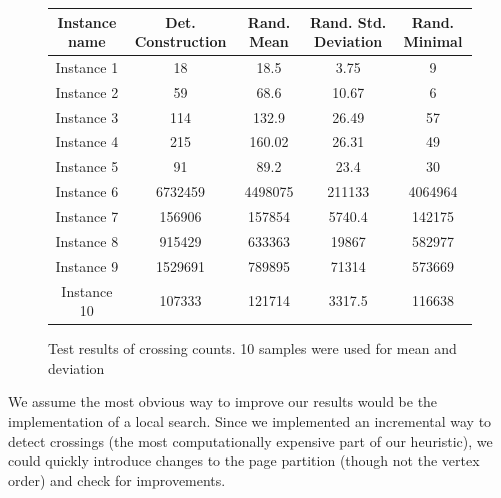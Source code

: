 \documentclass [11pt]{article}
\begin{document}
\begin{figure}[H]
\centering
  \begin{tabular}{| c | c | c | c | c |}
\hline
Instance name & Det. Construction & Rand. Mean & Rand. Std. Deviation & Rand. Minimal\\
\hline
Instance 1 & 18 & 18.5 & 3.75 & 9\\
\hline 
Instance 2 & 59 & 68.6 & 10.67 &6\\
\hline 
Instance 3 & 114 & 132.9 & 26.49 &57\\
\hline 
Instance 4 & 215 & 160.02 & 26.31 &49\\
\hline 
Instance 5 & 91 & 89.2  & 23.4 &30\\
\hline 
Instance 6 & 6732459 & 4498075 & 211133 &4064964\\
\hline 
Instance 7 & 156906 & 157854 & 5740.4 &  142175\\
\hline
Instance 8 & 915429 & 633363 & 19867 & 582977\\
\hline 
Instance 9 & 1529691 & 789895 & 71314 & 573669\\
\hline 
Instance 10 & 107333 & 121714 & 3317.5 &  116638\\
\hline 
\end{tabular}
\caption{Test results of crossing counts.  10 samples were used for mean and deviation}
\end{figure}




We assume the most obvious way to improve our results would be the implementation of a local search. Since we implemented an incremental way to detect crossings (the most computationally expensive part of our heuristic), we could quickly introduce changes to the page partition (though not the vertex order) and check for improvements. 
\end{document}
